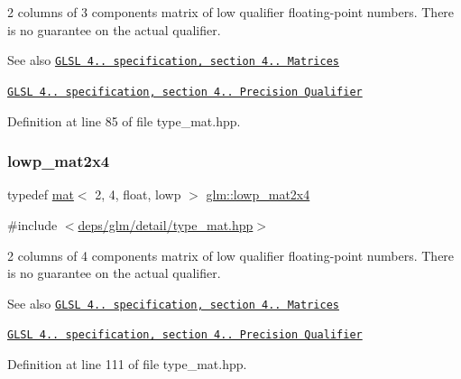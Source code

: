 2 columns of 3 components matrix of low qualifier floating-\/point numbers. There is no guarantee on the actual qualifier.

\begin{DoxySeeAlso}{See also}
\href{http://www.opengl.org/registry/doc/GLSLangSpec.4.20.8.pdf}{\tt G\+L\+SL 4.. specification, section 4.. Matrices} 

\href{http://www.opengl.org/registry/doc/GLSLangSpec.4.20.8.pdf}{\tt G\+L\+SL 4.. specification, section 4.. Precision Qualifier} 
\end{DoxySeeAlso}


Definition at line 85 of file type\+\_\+mat.\+hpp.

\mbox{\label{group__core__precision_ga674d889016f44d1084ec467c73df8434}} 
\subsubsection{\texorpdfstring{lowp\+\_\+mat2x4}{lowp\_mat2x4}}
{\footnotesize\ttfamily typedef \hyperlink{structglm_1_1mat}{mat}$<$ 2, 4, float, lowp $>$ \hyperlink{group__core__precision_ga674d889016f44d1084ec467c73df8434}{glm\+::lowp\+\_\+mat2x4}}



{\ttfamily \#include $<$\hyperlink{type__mat_8hpp}{deps/glm/detail/type\+\_\+mat.\+hpp}$>$}

2 columns of 4 components matrix of low qualifier floating-\/point numbers. There is no guarantee on the actual qualifier.

\begin{DoxySeeAlso}{See also}
\href{http://www.opengl.org/registry/doc/GLSLangSpec.4.20.8.pdf}{\tt G\+L\+SL 4.. specification, section 4.. Matrices} 

\href{http://www.opengl.org/registry/doc/GLSLangSpec.4.20.8.pdf}{\tt G\+L\+SL 4.. specification, section 4.. Precision Qualifier} 
\end{DoxySeeAlso}


Definition at line 111 of file type\+\_\+mat.\+hpp.

\mbox{\label{group__core__precision_ga8845e8da3db051cd798abc644850c6c2}} 
